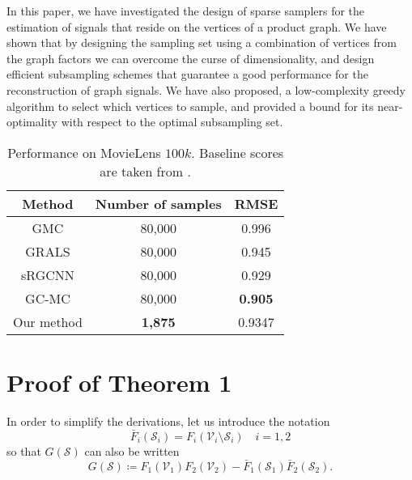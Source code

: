 \documentclass{article}
\begin{document}
In this paper, we have investigated the design of sparse samplers for the estimation of signals that reside on the vertices of a product graph. We have shown that by designing the sampling set using a combination of vertices from the graph factors we can overcome the curse of dimensionality, and design efficient subsampling schemes that guarantee a good performance for the reconstruction of graph signals. We have also proposed, a low-complexity greedy algorithm to select which vertices to sample, and provided a bound for its near-optimality with respect to the optimal subsampling set.

\begin{table}
\centering
\begin{tabular}{@{}ccc@{}}
\toprule
\textbf{Method} & \textbf{Number of samples} & \textbf{RMSE} \\ \midrule
GMC \cite{kalofolias2014matrix}            & 80,000                      & 0.996         \\ \midrule
GRALS  \cite{grals}         & 80,000                      & 0.945         \\ \midrule
sRGCNN\cite{monti2017geometric}         & 80,000                      & 0.929         \\ \midrule
GC-MC    \cite{berg2017graph}       & 80,000                      & \textbf{0.905}         \\ \midrule\midrule
Our method      & \textbf{1,875}                       & 0.9347        \\ \bottomrule
\end{tabular}
\caption{Performance on MovieLens $100k$. Baseline scores are taken from \cite{berg2017graph}.}
\label{tab:performance}
\end{table}
 
\appendix

\section{Proof of Theorem 1}
In order to simplify the derivations, let us introduce the notation
\begin{equation*}
  \bar{F}_i(\mathcal{S}_i)=F_i(\mathcal{V}_i\setminus\mathcal{S}_i)\quad i=1,2
\end{equation*}
so that $G(\mathcal{S})$ can also be written
\begin{equation*}
  G(\mathcal{S})\coloneqq F_1(\mathcal{V}_1)F_2(\mathcal{V}_2)-\bar{F}_1(\mathcal{S}_1)\bar{F}_2(\mathcal{S}_2).
\end{equation*}
\end{document}
